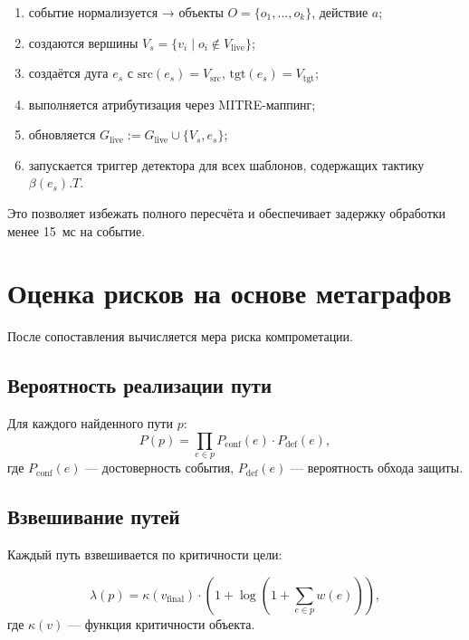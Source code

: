 \documentclass{article}
\begin{document}
\noindent
\begin{enumerate}
    \item событие нормализуется → объекты $O = \{o_1, ..., o_k\}$, действие $a$;
    \item создаются вершины $V_s = \{v_i \mid o_i \notin V_{\text{live}}\}$;
    \item создаётся дуга $e_s$ с $\text{src}(e_s) = V_{\text{src}}$, $\text{tgt}(e_s) = V_{\text{tgt}}$;
    \item выполняется атрибутизация через MITRE-маппинг;
    \item обновляется $G_{\text{live}} := G_{\text{live}} \cup \{V_s, e_s\}$;
    \item запускается триггер детектора для всех шаблонов, содержащих тактику $\beta(e_s).T$.
\end{enumerate}

Это позволяет избежать полного пересчёта и обеспечивает задержку обработки менее 15~мс на событие.

\section{Оценка рисков на основе метаграфов}\label{sec:ch3/sect5}

После сопоставления вычисляется мера риска компрометации.

\subsection{Вероятность реализации пути}

Для каждого найденного пути $p$:
\begin{equation}
    P(p) = \prod_{e \in p} P_{\text{conf}}(e) \cdot P_{\text{def}}(e),
    \label{eq:path_prob}
\end{equation}
где $P_{\text{conf}}(e)$ — достоверность события, $P_{\text{def}}(e)$ — вероятность обхода защиты.

\subsection{Взвешивание путей}

Каждый путь взвешивается по критичности цели:

\begin{equation}
    \lambda(p) = \kappa(v_{\text{final}}) \cdot \left(1 + \log \left(1 + \sum_{e \in p} w(e)\right)\right),
    \label{eq:path_weight}
\end{equation}
где $\kappa(v)$ — функция критичности объекта.
\end{document}
